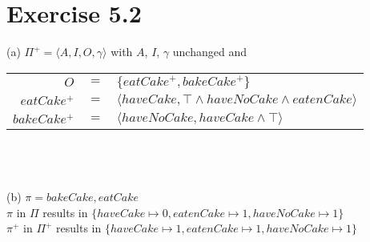 \documentclass[11pt,a4paper]{article}
\begin{document}
\section*{Exercise 5.2}
(a) $\Pi^+ = \langle A,I,O,\gamma \rangle$ with $A$, $I$, $\gamma$ unchanged and\\
\begin{tabular}{rcl}
$O$ & $=$ & $\{eatCake^+,bakeCake^+\}$\\
$eatCake^+$ & $=$ & $\langle haveCake, \top \land haveNoCake \land eatenCake\rangle$\\
$bakeCake^+$ & $=$ & $\langle haveNoCake, haveCake \land \top \rangle$\\
\end{tabular}\\
\\
\\
(b) $\pi = bakeCake, eatCake$\\
$\pi$ in $\Pi$ results in $\{haveCake \mapsto 0, eatenCake \mapsto 1, haveNoCake \mapsto 1\}$\\
$\pi^+$ in $\Pi^+$ results in $\{haveCake \mapsto 1, eatenCake \mapsto 1, haveNoCake \mapsto 1\}$\\
\end{document}
